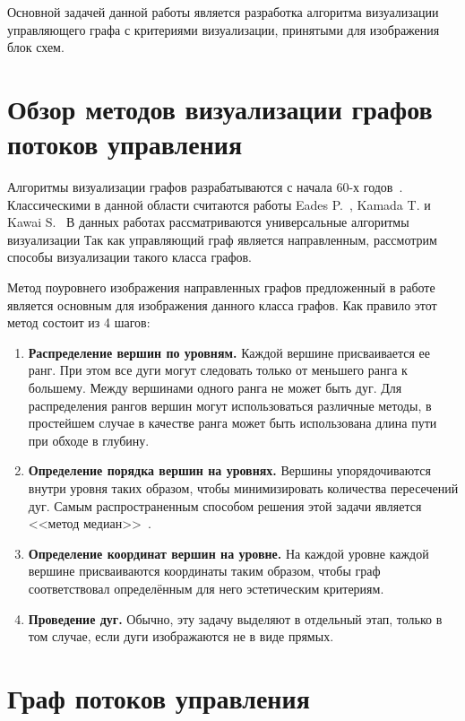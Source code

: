 \documentclass{jctart15a}
\begin{document}
Основной задачей данной работы является разработка алгоритма визуализации управляющего графа с критериями визуализации, принятыми для изображения блок схем.


\section{Обзор методов визуализации графов потоков управления}

Алгоритмы визуализации графов разрабатываются с начала 60-х годов~\cite{7}. Классическими в данной области считаются работы Eades P.~\cite{5}, Kamada T. и Kawai S.~\cite{6} В данных работах рассматриваются универсальные алгоритмы визуализации Так как управляющий граф является направленным, рассмотрим способы визуализации такого класса графов.

Метод поуровнего изображения направленных графов предложенный в работе~\cite{4} является основным для изображения данного класса графов. Как правило этот метод состоит из 4 шагов:
\begin{enumerate}
	\item \textbf{Распределение вершин по уровням.} Каждой вершине присваивается ее ранг. При этом все дуги могут следовать только от меньшего ранга к большему. Между вершинами одного ранга не может быть дуг. Для распределения рангов вершин могут использоваться различные методы, в простейшем случае в качестве ранга может быть использована длина пути при обходе в глубину.
	\item \textbf{Определение порядка вершин на уровнях.} Вершины упорядочиваются внутри уровня таких образом, чтобы минимизировать количества пересечений дуг. Самым распространенным способом решения этой задачи является <<метод медиан>>~\cite{8}.
	\item \textbf{Определение координат вершин на уровне.} На каждой уровне каждой вершине присваиваются координаты таким образом, чтобы граф соответствовал определённым для него эстетическим критериям.
	\item \textbf{Проведение дуг.}	Обычно, эту задачу выделяют в отдельный этап, только в том случае, если дуги изображаются не в виде прямых.
\end{enumerate}




\section{Граф потоков управления}
\end{document}
